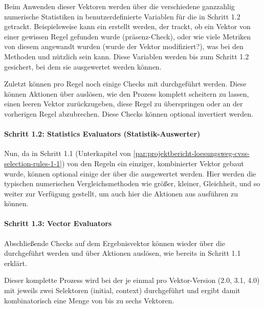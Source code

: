 Beim Anwenden dieser Vektoren werden über die  verschiedene ganzzahlig numerische Statistiken in benutzerdefinierte Variablen für die  in Schritt 1.2 getrackt.
Beispielsweise kann ein  erstellt werden, der trackt, ob ein Vektor von einer gewissen Regel gefunden wurde (präsenz-Check), oder wie viele Metriken von diesem angewandt wurden (wurde der Vektor modifiziert?), was bei den Methoden  und  nützlich sein kann.
Diese Variablen werden bis zum Schritt 1.2 gesichert, bei dem sie ausgewertet werden können.

Zuletzt können pro Regel noch einige Checks mit  durchgeführt werden.
Diese können Aktionen über  auslösen, wie den Prozess komplett scheitern zu lassen, einen leeren Vektor zurückzugeben, diese Regel zu überspringen oder an der vorherigen Regel abzubrechen.
Diese Checks können optional invertiert werden.

\paragraph{Schritt 1.2: Statistics Evaluators (Statistik-Auswerter)}

Nun, da in Schritt 1.1 (Unterkapitel von \ref{par:projektbericht-loesungsweg-cvss-selection-rules-1-1}) von den Regeln ein einziger, kombinierter Vektor gebaut wurde, können optional einige der  über die  ausgewertet werden.
Hier werden die typischen numerischen Vergleichsmethoden wie größer, kleiner, Gleichheit, und so weiter zur Verfügung gestellt, um auch hier die Aktionen aus  ausführen zu können.

\paragraph{Schritt 1.3: Vector Evaluators}

Abschließende Checks auf dem Ergebnisvektor können wieder über die  durchgeführt werden und über  Aktionen auslösen, wie bereits in Schritt 1.1 erklärt.

Dieser komplette Prozess wird bei der {\metaeffekt} je einmal pro Vektor-Version (2.0, 3.1, 4.0) mit jeweils zwei Selektoren (initial, context) durchgeführt und ergibt damit kombinatorisch eine Menge von bis zu sechs Vektoren.

